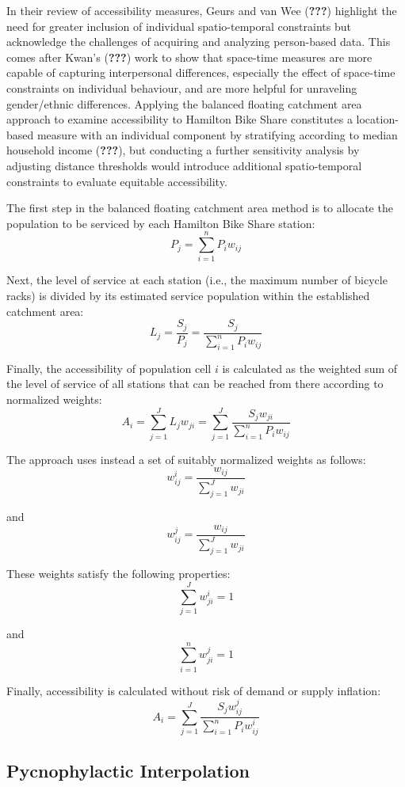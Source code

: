 \documentclass[]{elsarticle} %
\begin{document}
In their review of accessibility measures, Geurs and van Wee
({\textbf{???}}) highlight the need for greater inclusion of individual
spatio-temporal constraints but acknowledge the challenges of acquiring
and analyzing person-based data. This comes after Kwan's
({\textbf{???}}) work to show that space-time measures are more capable
of capturing interpersonal differences, especially the effect of
space-time constraints on individual behaviour, and are more helpful for
unraveling gender/ethnic differences. Applying the balanced floating
catchment area approach to examine accessibility to Hamilton Bike Share
constitutes a location-based measure with an individual component by
stratifying according to median household income ({\textbf{???}}), but
conducting a further sensitivity analysis by adjusting distance
thresholds would introduce additional spatio-temporal constraints to
evaluate equitable accessibility.

The first step in the balanced floating catchment area method is to
allocate the population to be serviced by each Hamilton Bike Share
station: \[
P_j = {\sum_{i = 1}^{n} P_i{w_{ij}}}
\]

Next, the level of service at each station (i.e., the maximum number of
bicycle racks) is divided by its estimated service population within the
established catchment area: \[
L_j = \frac {S_j}{P_j} = \frac {S_j}{{\sum_{i = 1}^{n} P_i{w_{ij}}}}
\]

Finally, the accessibility of population cell \(i\) is calculated as the
weighted sum of the level of service of all stations that can be reached
from there according to normalized weights: \[
A_i = {\sum_{j = 1}^{J} L_j{w_{ji}}} = {\sum_{j = 1}^{J} \frac {S_j{w_{ji}}}{\sum_{i = 1}^{n} P_i{w_{ij}}}}
\]

The approach uses instead a set of suitably normalized weights as
follows: \[
{w_{ij}^{i} = \frac {w_{ij}}{\sum_{j = 1}^{J} {w_{ji}}}}
\]

and \[
{w_{ij}^{j} = \frac {w_{ij}}{\sum_{j = 1}^{J} {w_{ji}}}}
\]

These weights satisfy the following properties: \[
\sum_{j = 1}^{J} {w^i_{ji}} = 1
\]

and \[
\sum_{i = 1}^{n} {w^j_{ji}} = 1
\]

Finally, accessibility is calculated without risk of demand or supply
inflation: \[
A_i = {\sum_{j = 1}^{J} \frac {S_j{w^j_{ij}}}{\sum_{i = 1}^{n} P_i{w^i_{ij}}}}
\]

\hypertarget{pycnophylactic-interpolation}{%
\subsection{Pycnophylactic
Interpolation}\label{pycnophylactic-interpolation}}
\end{document}

